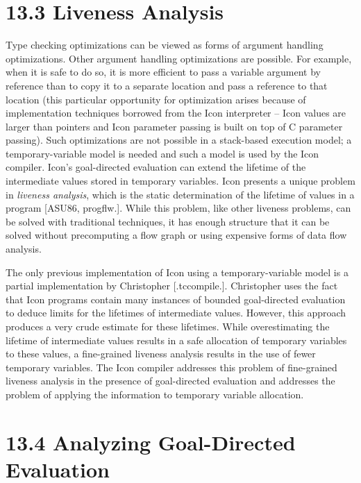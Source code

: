 \section[13.3 Liveness Analysis]{13.3 Liveness Analysis}

Type checking optimizations can be viewed as forms of argument
handling optimizations. Other argument handling optimizations are
possible. For example, when it is safe to do so, it is more efficient
to pass a variable argument by reference than to copy it to a separate
location and pass a reference to that location (this particular
opportunity for optimization arises because of implementation
techniques borrowed from the Icon interpreter -- Icon values are
larger than pointers and Icon parameter passing is built on top of C
parameter passing). Such optimizations are not possible in a
stack-based execution model; a temporary-variable model is needed and
such a model is used by the Icon compiler.  Icon's goal-directed
evaluation can extend the lifetime of the intermediate values stored
in temporary variables. Icon presents a unique problem in
\textit{liveness analysis}, which is the static determination of the
lifetime of values in a program [ASU86, progflw.]. While this problem,
like other liveness problems, can be solved with traditional
techniques, it has enough structure that it can be solved without
precomputing a flow graph or using expensive forms of data flow
analysis.


The only previous implementation of Icon using a temporary-variable
model is a partial implementation by Christopher
[.tccompile.]. Christopher uses the fact that Icon programs contain
many instances of bounded goal-directed evaluation to deduce limits
for the lifetimes of intermediate values. However, this approach
produces a very crude estimate for these lifetimes. While
overestimating the lifetime of intermediate values results in a safe
allocation of temporary variables to these values, a fine-grained
liveness analysis results in the use of fewer temporary variables. The
Icon compiler addresses this problem of fine-grained liveness analysis
in the presence of goal-directed evaluation and addresses the problem
of applying the information to temporary variable allocation.

\section[13.4 Analyzing Goal-Directed Evaluation]{13.4 Analyzing Goal-Directed Evaluation}

